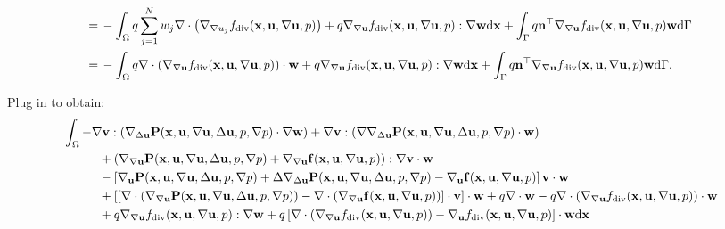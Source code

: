 \documentclass[oneside,11pt]{book}
\numberwithin{equation}{section}
\begin{document}
\begin{enumerate}[leftmargin=0in]
\begin{align*}
        =&\, -\int_\Omega q\sum_{j=1}^N w_j\nabla\cdot\left(\nabla_{\nabla u_j}f_{\rm div}({\bf x},{\bf u},\nabla{\bf u},p)\right) + q\nabla_{\nabla{\bf u}}f_{\rm div}({\bf x},{\bf u},\nabla{\bf u},p):\nabla{\bf w}{\rm d}{\bf x} + \int_\Gamma q{\bf n}^\top\nabla_{\nabla{\bf u}}f_{\rm div}({\bf x},{\bf u},\nabla{\bf u},p){\bf w}{\rm d}\Gamma\\
        =&\, -\int_\Omega q\nabla\cdot\left(\nabla_{\nabla{\bf u}}f_{\rm div}({\bf x},{\bf u},\nabla{\bf u},p)\right)\cdot{\bf w} + q\nabla_{\nabla{\bf u}}f_{\rm div}({\bf x},{\bf u},\nabla{\bf u},p):\nabla{\bf w}{\rm d}{\bf x} + \int_\Gamma q{\bf n}^\top\nabla_{\nabla{\bf u}}f_{\rm div}({\bf x},{\bf u},\nabla{\bf u},p){\bf w}{\rm d}\Gamma.
    \end{align*}
\end{enumerate}
Plug in to obtain:
\begin{align*}
    &\int_\Omega -\nabla{\bf v}:\left(\nabla_{\Delta{\bf u}}{\bf P}({\bf x},{\bf u},\nabla{\bf u},\Delta{\bf u},p,\nabla p)\cdot\nabla{\bf w}\right) + \nabla{\bf v}:\left(\nabla\nabla_{\Delta{\bf u}}{\bf P}({\bf x},{\bf u},\nabla{\bf u},\Delta{\bf u},p,\nabla p)\cdot{\bf w}\right)\\
    &\hspace{1cm} + \left(\nabla_{\nabla{\bf u}}{\bf P}({\bf x},{\bf u},\nabla{\bf u},\Delta{\bf u},p,\nabla p) + \nabla_{\nabla{\bf u}}{\bf f}({\bf x},{\bf u},\nabla{\bf u},p)\right):\nabla{\bf v}\cdot{\bf w}\\
    &\hspace{1cm} - \left[\nabla_{\bf u}{\bf P}({\bf x},{\bf u},\nabla{\bf u},\Delta{\bf u},p,\nabla p) + \Delta\nabla_{\Delta{\bf u}}{\bf P}({\bf x},{\bf u},\nabla{\bf u},\Delta{\bf u},p,\nabla p) - \nabla_{\bf u}{\bf f}({\bf x},{\bf u},\nabla{\bf u},p)\right]{\bf v}\cdot{\bf w}\\
    &\hspace{1cm}+ \left[\left[\nabla\cdot\left(\nabla_{\nabla{\bf u}}{\bf P}({\bf x},{\bf u},\nabla{\bf u},\Delta{\bf u},p,\nabla p)\right) - \nabla\cdot\left(\nabla_{\nabla{\bf u}}{\bf f}({\bf x},{\bf u},\nabla{\bf u},p)\right)\right]\cdot{\bf v}\right]\cdot{\bf w} + q\nabla\cdot{\bf w} - q\nabla\cdot\left(\nabla_{\nabla{\bf u}}f_{\rm div}({\bf x},{\bf u},\nabla{\bf u},p)\right)\cdot{\bf w}\\
    &\hspace{1cm}+ q\nabla_{\nabla{\bf u}}f_{\rm div}({\bf x},{\bf u},\nabla{\bf u},p):\nabla{\bf w} + q\left[\nabla\cdot\left(\nabla_{\nabla{\bf u}}f_{\rm div}({\bf x},{\bf u},\nabla{\bf u},p)\right) - \nabla_{\bf u}f_{\rm div}({\bf x},{\bf u},\nabla{\bf u},p)\right]\cdot{\bf w}{\rm d}{\bf x}\\

\end{align*}
\end{document}
